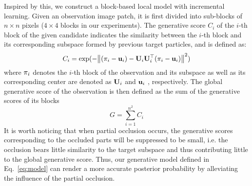 \documentclass[preprint,12pt,review]{elsarticle}
\begin{document}
%
Inspired by this, we construct a block-based local model with incremental learning.
%
Given an observation image patch, it is first divided into sub-blocks of $n \times n$ pixels ($4 \times 4$ blocks in our experiments).
%
The generative score ${{C_{i}}} $ of the $i$-th block of the given candidate indicates the similarity between the $i$-th block and its corresponding subspace formed by previous target particles, and is defined as:
\begin{equation}{C_i} = \exp ( - {\left\| {({\mathbf{\pi}_i} - {{\bf{u}}_i}) - {{\bf{U}}_i}{\bf{U}}_i^ \top ({\bf{\pi}}_i - {{
\bf{u}}_i})} \right\|^2})
\end{equation}
where ${\bf{\pi}}_i$ denotes the $i$-th block of the observation and its subspace as well as its corresponding center are denoted as ${{\bf{U}}_{i}}$ and ${{\bf{u}}_{i}}$ , respectively.
The global generative score of the observation is then defined as the sum of the generative scores of its blocks
\begin{equation}\label{eq:model}
  G = \sum \limits_{i=1}^{n^2} C_i
\end{equation}
%
It is worth noticing that when partial occlusion occurs, the generative scores corresponding to the occluded parts will be suppressed to be small, i.e. the occlusion bears little similarity to the target subspace and thus contributing little to the global generative score.
%
Thus, our generative model defined in Eq.~\ref{eq:model} can render a more accurate posterior probability by alleviating the influence of the partial occlusion.
%
\end{document}
